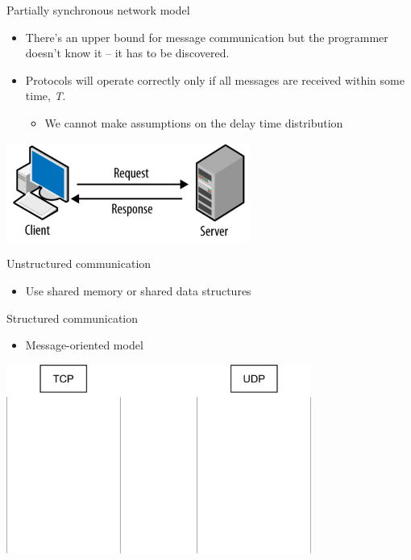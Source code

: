 \begin{slide}

	
	Partially synchronous network model
	\begin{itemize}
		\item There’s an upper bound for message communication but the programmer doesn’t know it – it has to be discovered.
		\item Protocols will operate correctly only if all messages are received within some time, \textit{T}.
		\begin{itemize}
			\item We cannot make assumptions on the delay time distribution
		\end{itemize}
	\end{itemize}
	
\end{slide}

\begin{slide}


    \includegraphics[width=80mm]{client-server-model.png}
    \bigskip

    Unstructured communication 
    \begin{itemize}
        \item Use shared memory or shared data structures
    \end{itemize}

    Structured communication 
    \begin{itemize}
        \item Message-oriented model
    \end{itemize}

\end{slide}

\begin{slide}


    \includegraphics[width=100mm]{tcp-udp.png}

\end{slide}

